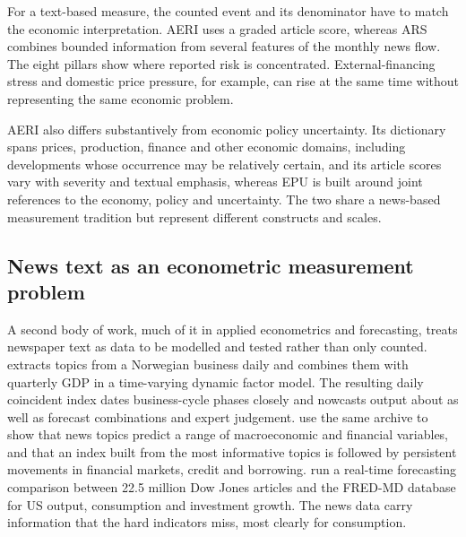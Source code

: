 \documentclass[12pt]{article}
\begin{document}
For a text-based measure, the counted event and its denominator have to match the economic interpretation. AERI uses a graded article score, whereas ARS combines bounded information from several features of the monthly news flow. The eight pillars show where reported risk is concentrated. External-financing stress and domestic price pressure, for example, can rise at the same time without representing the same economic problem.

AERI also differs substantively from economic policy uncertainty. Its dictionary spans prices, production, finance and other economic domains, including developments whose occurrence may be relatively certain, and its article scores vary with severity and textual emphasis, whereas EPU is built around joint references to the economy, policy and uncertainty. The two share a news-based measurement tradition but represent different constructs and scales.
\subsection{News text as an econometric measurement problem}\label{sec:literature_text_econometrics}
A second body of work, much of it in applied econometrics and forecasting, treats newspaper text as data to be modelled and tested rather than only counted. \citet{thorsrud2020} extracts topics from a Norwegian business daily and combines them with quarterly GDP in a time-varying dynamic factor model. The resulting daily coincident index dates business-cycle phases closely and nowcasts output about as well as forecast combinations and expert judgement. \citet{larsen2019} use the same archive to show that news topics predict a range of macroeconomic and financial variables, and that an index built from the most informative topics is followed by persistent movements in financial markets, credit and borrowing. \citet{ellingsen2022} run a real-time forecasting comparison between 22.5 million Dow Jones articles and the FRED-MD database for US output, consumption and investment growth. The news data carry information that the hard indicators miss, most clearly for consumption.
\end{document}
